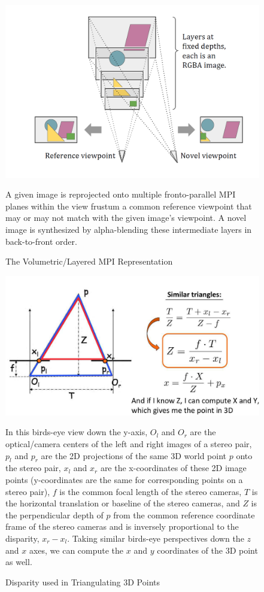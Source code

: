 \begin{figure}[!h]
    \includegraphics[width=1\columnwidth]{figures/mpi-layered-representation.png}
    \caption{The Volumetric/Layered MPI Representation}
    \label{fig:mpi-layered-representation}
    {\small A given image is reprojected onto multiple fronto-parallel MPI planes within the view frustum a common reference viewpoint that may or may not match with the given image's viewpoint. A novel image is synthesized by alpha-blending these intermediate layers in back-to-front order.}
\end{figure}

\begin{figure}[!h]
    \includegraphics[width=1\columnwidth]{figures/disparity-triangulation.png}
    \caption{Disparity used in Triangulating 3D Points~\cite{fidler_depth_2021}}
    \label{fig:disparity-triangulation}
    {\small In this birds-eye view down the y-axis, $O_l$ and $O_r$ are the optical/camera centers of the left and right images of a stereo pair, $p_l$ and $p_r$ are the 2D projections of the same 3D world point $p$ onto the stereo pair, $x_l$ and $x_r$ are the x-coordinates of these 2D image points (y-coordinates are the same for corresponding points on a stereo pair), $f$ is the common focal length of the stereo cameras, $T$ is the horizontal translation or baseline of the stereo cameras, and $Z$ is the perpendicular depth of $p$ from the common reference coordinate frame of the stereo cameras and is inversely proportional to the disparity, $x_r - x_l$. Taking similar birds-eye perspectives down the $z$ and $x$ axes, we can compute the $x$ and $y$ coordinates of the 3D point as well.}
\end{figure}

